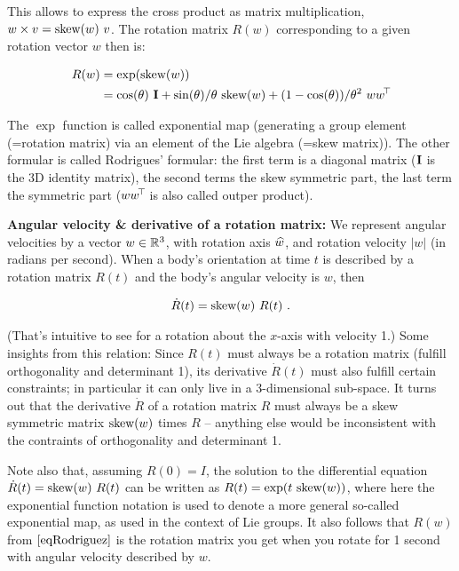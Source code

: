 This allows to express the cross
product as matrix multiplication, $w \times v = \text{skew}(w)~ v$. The rotation matrix $R(w)$ 
corresponding to a given rotation vector $w$ then is:

$$\begin{align}\label{eqRodriguez}
R(w)
 &= \exp(\text{skew}(w)) \\
 &= \cos(\theta)~ {\rm\bf I} + \sin(\theta)/\theta~ \text{skew}(w) + (1-\cos(\theta))/\theta^2~ w w^{\!\top\!}
\end{align}$$

The $\exp$ function is called exponential map (generating a group
element (=rotation matrix) via an element of the Lie algebra (=skew
matrix)). The other formular is called Rodrigues' formular: the first
term is a diagonal matrix (${\rm\bf I}$ is the 3D identity matrix), the second
terms the skew symmetric part, the last term the symmetric part ($w
w^{\!\top\!}$ is also called outper product).


\textbf{Angular velocity \& derivative of a rotation matrix:} We
represent angular velocities by a vector $w\in{\mathbb{R}}^3$, with rotation axis
$\widehat w$, and rotation velocity $|w|$ (in radians per second). When a body's orientation at time
$t$ is described by a rotation matrix $R(t)$ and the body's angular
velocity is $w$, then

$$\begin{align}\label{eqDotR}
\dot R(t) = \text{skew}(w)~ R(t)~.
\end{align}$$

(That's intuitive to see for a rotation about the $x$-axis with
velocity 1.) Some insights from this relation: Since $R(t)$ must
always be a rotation matrix (fulfill orthogonality and determinant 1),
its derivative $\dot R(t)$ must also fulfill certain constraints; in
particular it can only live in a 3-dimensional sub-space. It turns out
that the derivative $\dot R$ of a rotation matrix $R$ must always be a
skew symmetric matrix $\text{skew}(w)$ times $R$ -- anything else would be
inconsistent with the contraints of orthogonality and determinant 1.

Note also that, assuming $R(0)=I$, the solution to the differential
equation $\dot R(t) = \text{skew}(w)~ R(t)$ can be written as
$R(t)=\exp(t~ \text{skew}(w))$, where here the exponential function notation
is used to denote a more general so-called exponential map, as used in
the context of Lie groups. It also follows that $R(w)$ from
$\eqref{eqRodriguez}$ is the rotation matrix you get when you rotate for
1 second with angular velocity described by $w$.


